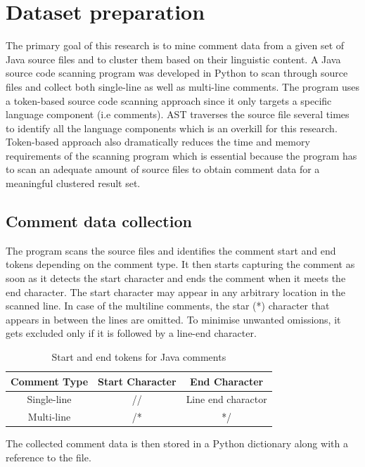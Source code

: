 \documentclass[conference]{IEEEtran}
\begin{document}
\section{Dataset preparation}

The primary goal of this research is to mine comment data from a given set of Java source files and to cluster them based on their linguistic content. A Java source code scanning program was developed in Python to scan through source files and collect both single-line as well as multi-line comments. The program uses a token-based source code scanning approach since it only targets a specific language component (i.e comments). AST traverses the source file several times to identify all the language components which is an overkill for this research. Token-based approach also dramatically reduces the time and memory requirements of the scanning program \cite{4023995} which is essential because the program has to scan an adequate amount of source files to obtain comment data for a meaningful clustered result set.

\subsection{Comment data collection}

The program scans the source files and identifies the comment start and end tokens depending on the comment type. It then starts capturing the comment as soon as it detects the start character and ends the comment when it meets the end character. The start character may appear in any arbitrary location in the scanned line. In case of the multiline comments, the star (*) character that appears in between the lines are omitted. To minimise unwanted omissions, it gets excluded only if it is followed by a line-end character. 

\begin{table}[!h]
\renewcommand{\arraystretch}{1.3}

\caption{Start and end tokens for Java comments}
\label{table_example}
\centering
\begin{tabular}{c|c|c}
\bfseries Comment Type & \bfseries Start Character & \bfseries End Character\\
\hline
Single-line & // & Line end charactor\\
\hline
Multi-line & /* & */
\end{tabular}
\end{table}

The collected comment data is then stored in a Python dictionary along with a reference to the file. 
\end{document}
